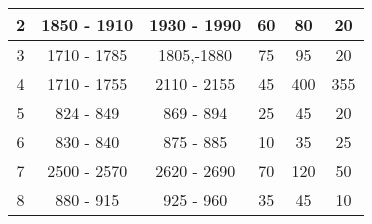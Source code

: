 \begin{table}[]
\begin{tabular}{|c|c|c|c|c|c|}
2                                                           & 1850 - 1910                                            & 1930 - 1990                                              & 60                                                                   & 80                                                               & 20                                                          \\ \hline
3                                                           & 1710 - 1785                                            & 1805,-1880                                               & 75                                                                   & 95                                                               & 20                                                          \\ \hline
4                                                           & 1710 - 1755                                            & 2110 - 2155                                              & 45                                                                   & 400                                                              & 355                                                         \\ \hline
5                                                           & 824 - 849                                              & 869 - 894                                                & 25                                                                   & 45                                                               & 20                                                          \\ \hline
6                                                           & 830 - 840                                              & 875 - 885                                                & 10                                                                   & 35                                                               & 25                                                          \\ \hline
7                                                           & 2500 - 2570                                            & 2620 - 2690                                              & 70                                                                   & 120                                                              & 50                                                          \\ \hline
8                                                           & 880 - 915                                              & 925 - 960                                                & 35                                                                   & 45                                                               & 10                                                          \\ \hline

\end{tabular}
\end{table}
